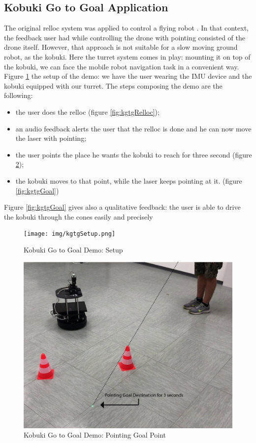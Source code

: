 \subsection{Kobuki Go to Goal Application}
The original relloc system was applied to control a flying robot \cite{gromov2018robot}. In that context, the feedback user had while controlling the drone with pointing consisted of the drone itself. However, that approach is not suitable for a slow moving ground robot, as the kobuki. Here the turret system comes in play: mounting it on top of the kobuki, we can face the mobile robot navigation task in a convenient way.\\
Figure \ref{fig:kgtgSetup} the setup of the demo: we have the user wearing the IMU device and the kobuki equipped with our turret. The steps composing the demo are the following:
\begin{itemize}
    \item the user does the relloc (figure \ref{fig:kgtgRelloc});
    \item an audio feedback alerts the user that the relloc is done and he can now move the laser with pointing;
    \item the user points the place he wants the kobuki to reach for three second (figure \ref{fig:kgtgPointing});
    \item the kobuki moves to that point, while the laser keeps pointing at it. (figure \ref{fig:kgtgGoal})
\end{itemize}
Figure \ref{fig:kgtgGoal} gives also a qualitative feedback: the user is able to drive the kobuki through the cones easily and precisely



\begin{figure}
	\centering
	\texttt{[image: img/kgtgSetup.png]}%
	\caption{Kobuki Go to Goal Demo: Setup}
	\label{fig:kgtgSetup}
\end{figure}
\begin{figure}
	\centering
	\includegraphics[width=\textwidth]{img/kgtgPointing.png}%
	\caption{Kobuki Go to Goal Demo: Pointing Goal Point}
	\label{fig:kgtgPointing}
\end{figure}

